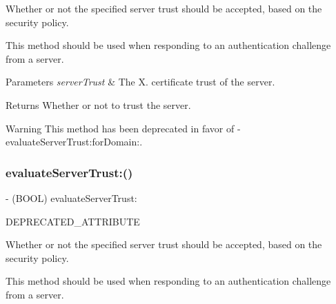 Whether or not the specified server trust should be accepted, based on the security policy.

This method should be used when responding to an authentication challenge from a server.


\begin{DoxyParams}{Parameters}
{\em server\+Trust} & The X. certificate trust of the server.\\
\hline
\end{DoxyParams}
\begin{DoxyReturn}{Returns}
Whether or not to trust the server.
\end{DoxyReturn}
\begin{DoxyWarning}{Warning}
This method has been deprecated in favor of {\ttfamily -\/evaluate\+Server\+Trust\+:for\+Domain\+:}. 
\end{DoxyWarning}
\mbox{\label{interface_a_f_security_policy_a404e83f245843cb7fd6408d5e9ee15e0}} 
\subsubsection{\texorpdfstring{evaluate\+Server\+Trust\+:()}{evaluateServerTrust:()}\hspace{0.1cm}{\footnotesize\ttfamily [2/3]}}
{\footnotesize\ttfamily -\/ (B\+O\+OL) evaluate\+Server\+Trust\+: \begin{DoxyParamCaption}\item[{(Sec\+Trust\+Ref)}]{D\+E\+P\+R\+E\+C\+A\+T\+E\+D\+\_\+\+A\+T\+T\+R\+I\+B\+U\+TE }\end{DoxyParamCaption}}

Whether or not the specified server trust should be accepted, based on the security policy.

This method should be used when responding to an authentication challenge from a server.


